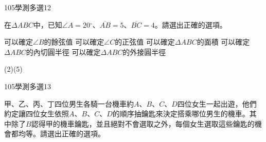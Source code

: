 \begin{QUESTIONS}
\begin{QUESTION}
\begin{QSOLLIST}
        \end{QSOLLIST}
        \begin{QEMPTYSPACE}
        \end{QEMPTYSPACE}
    \end{QUESTION}
    \begin{QUESTION}
        \begin{ExamInfo}{105}{學測}{多選}{12}
        \end{ExamInfo}
        \begin{ExamAnsRateInfo}{30}{46}{27}{17}
        \end{ExamAnsRateInfo}
        \begin{QBODY}
            在$\Delta ABC$中，已知$\angle A=20{}^\circ $、$\overline{AB}=5$、$\overline{BC}=4$。請選出正確的選項。
			\begin{QOPS}
				\QOP 可以確定$\angle B$的餘弦值
				\QOP 可以確定$\angle C$的正弦值
				\QOP 可以確定$\Delta ABC$的面積
				\QOP 可以確定$\Delta ABC$的內切圓半徑
				\QOP 可以確定$\Delta ABC$的外接圓半徑
			\end{QOPS}
        \end{QBODY}
        \begin{QFROMS}
        \end{QFROMS}
        \begin{QTAGS}\end{QTAGS}
        \begin{QANS}
            (2)(5)
        \end{QANS}
        \begin{QSOLLIST}
        \end{QSOLLIST}
        \begin{QEMPTYSPACE}
        \end{QEMPTYSPACE}
    \end{QUESTION}
    \begin{QUESTION}
        \begin{ExamInfo}{105}{學測}{多選}{13}
        \end{ExamInfo}
        \begin{ExamAnsRateInfo}{56}{77}{58}{33}
        \end{ExamAnsRateInfo}
        \begin{QBODY}
            甲、乙、丙、丁四位男生各騎一台機車約$A$、$B$、$C$、$D$四位女生一起出遊，他們約定讓四位女生依照$A$、$B$、$C$、$D$的順序抽鑰匙來決定搭乘哪位男生的機車。其中除了$B$認得甲的機車鑰匙，並且絕對不會選取之外，每個女生選取這些鑰匙的機會都均等。請選出正確的選項。

\end{QBODY}
\end{QUESTION}
\end{QUESTIONS}
